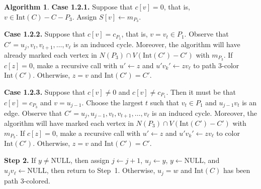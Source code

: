 \documentclass[12pt,letterpaper]{article}
\theoremstyle{plain}
\theoremstyle{definition}
\theoremstyle{break}
\newtheorem{algorithm}[lemma]{Algorithm}     %
\begin{document}
\begin{algorithm}
\textbf{Case 1.2.1.} Suppose that $c[v]=0$, that is, $v\in\text{Int}(C)-C-P_3$.
Assign $S[v]\leftarrow m_{P_3}$.

\textbf{Case 1.2.2.} Suppose that $c[v]=c_{P_1}$, that is,
$v=v_t\in P_1$. Observe that $C'=u_j,v_t,v_{t+1},\ldots,v_\ell$ is an induced
cycle. Moreover,
the algorithm will have already marked each vertex in $N(P_3)\cap
V(\text{Int}(C')-C')$ with $m_{P_3}$.
If $c[z]=0$, make a recursive call with $u'\leftarrow z$ and
$u'v_k'\leftarrow zv_\ell$ to path $3$-color $\text{Int}(C')$.
Otherwise, $z=v$ and $\text{Int}(C')=C'$.

\textbf{Case 1.2.3.} Suppose that $c[v]\ne 0$ and $c[v]\ne c_{P_1}$.
Then it must
be that $c[v]= c_{P_3}$ and $v=u_{j-1}$. Choose the largest $t$ such that
$v_t\in P_1$ and $u_{j-1}v_{t}$ is an edge. Observe that
$C'=u_j,u_{j-1},v_t,v_{t+1},\ldots,v_\ell$ is an induced cycle. Moreover,
the algorithm will have marked each vertex in $N(P_3)\cap
V(\text{Int}(C')-C')$ with $m_{P_3}$.
If $c[z]=0$, make a recursive call with $u'\leftarrow z$ and
$u'v_k'\leftarrow zv_\ell$ to color $\text{Int}(C')$. Otherwise,
$z=v$ and $\text{Int}(C')=C'$.

\textbf{Step 2.} If $y\ne\text{NULL}$, then 
assign $j\leftarrow j+1$, $u_j\leftarrow y$, $y\leftarrow\text{NULL}$, and
$u_jv_\ell\leftarrow\text{NULL}$, then return to Step~1.
Otherwise, $u_j=w$ and $\text{Int}(C)$ has been path
$3$-colored.
\end{algorithm}
\end{document}
